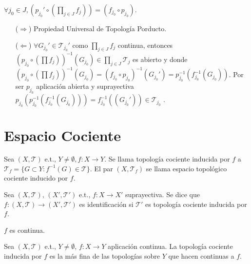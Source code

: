 \begin{dem}
  $\forall j_{0} \in J, (p_{j_{0}}' \circ (\prod_{j \in J} f_{j})) = (f_{j_{0}} \circ p_{j_{0}})$.
  \begin{enumerate}[label=(\roman*)]
    \item [($\Rightarrow$)] Propiedad Universal de Topología Porducto.
    \item [($\Leftarrow$)] $\forall G_{j_{0}}' \in \mathcal{T}_{j_{0}}'$ como $\prod_{j \in J} f_{j}$ continua, entonces $(p_{j_{0}} \circ (\prod f_{j}))^{-1}(G_{j_{0}}) \in \prod_{j \in J} \mathcal{T}_{j}$ es abierto y donde $(p_{j_{0}} \circ (\prod f_{j}))^{-1}(G_{j_{0}}) = (f_{j_{0}} \circ p_{j_{0}})^{-1}(G_{j_{0}}') = p_{j_{0}}^{-1}(f_{j_{0}}^{-1}(G_{j_{0}}))$. Por ser $p_{j_{0}}$ aplicación abierta y suprayectiva $p_{j_{0}}(p_{j_{0}}^{-1}(f_{j_{0}}^{-1}(G_{j_{0}}))) = f_{j_{0}}^{-1}((G_{j_{0}}')) \in \mathcal{T}_{j_{0}}$ .
  \end{enumerate}
\end{dem}

\section{Espacio Cociente}

\begin{defn}
  Sea $( X, \mathcal{T} )$ e.t., $Y \neq \emptyset, f: X \to Y$. Se llama topología cociente inducida por $f $ a $\mathcal{T}_{f} = \{ G \subset Y : f^{-1}(G) \in \mathcal{T} \}$. El par $( X , \mathcal{T}_{f})$ se llama espacio topológico cociente inducido por $f$.
\end{defn}

\begin{defn}[Identificación]
  Sea $( X, \mathcal{T} )$, $( X', \mathcal{T}' )$ e.t., $f: X \to X'$ suprayectiva. Se dice que $f: ( X, \mathcal{T} ) \to ( X', \mathcal{T}' )$ es identificación si $\mathcal{T}'$ es topología cociente inducida por $f$.
\end{defn}

\begin{obs}
  $f$ es continua.
\end{obs}

\begin{prop}
  Sea $( X, \mathcal{T} )$ e.t., $Y \neq \emptyset$, $f: X \to Y$ aplicación continua. La topología cociente inducida por $f$ es la más fina de las topologías sobre $Y$ que hacen continuas a $f$.
\end{prop}


